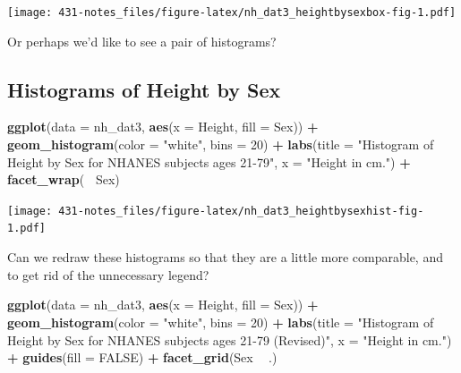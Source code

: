 \documentclass[
]{book}
\newenvironment{Shaded}{\begin{snugshade}}{\end{snugshade}}
\newcommand{\DataTypeTok}[1]{\textcolor[rgb]{0.13,0.29,0.53}{#1}}
\newcommand{\DecValTok}[1]{\textcolor[rgb]{0.00,0.00,0.81}{#1}}
\newcommand{\KeywordTok}[1]{\textcolor[rgb]{0.13,0.29,0.53}{\textbf{#1}}}
\newcommand{\NormalTok}[1]{#1}
\newcommand{\OperatorTok}[1]{\textcolor[rgb]{0.81,0.36,0.00}{\textbf{#1}}}
\newcommand{\OtherTok}[1]{\textcolor[rgb]{0.56,0.35,0.01}{#1}}
\newcommand{\StringTok}[1]{\textcolor[rgb]{0.31,0.60,0.02}{#1}}
\begin{document}
\texttt{[image: 431-notes\_files/figure-latex/nh\_dat3\_heightbysexbox-fig-1.pdf]}

Or perhaps we'd like to see a pair of histograms?

\hypertarget{histograms-of-height-by-sex}{%
\subsection{Histograms of Height by Sex}\label{histograms-of-height-by-sex}}

\begin{Shaded}
\begin{Highlighting}[]
\KeywordTok{ggplot}\NormalTok{(}\DataTypeTok{data =}\NormalTok{ nh_dat3, }\KeywordTok{aes}\NormalTok{(}\DataTypeTok{x =}\NormalTok{ Height, }\DataTypeTok{fill =}\NormalTok{ Sex)) }\OperatorTok{+}\StringTok{ }
\StringTok{    }\KeywordTok{geom_histogram}\NormalTok{(}\DataTypeTok{color =} \StringTok{"white"}\NormalTok{, }\DataTypeTok{bins =} \DecValTok{20}\NormalTok{) }\OperatorTok{+}\StringTok{ }
\StringTok{    }\KeywordTok{labs}\NormalTok{(}\DataTypeTok{title =} \StringTok{"Histogram of Height by Sex for NHANES subjects ages 21-79"}\NormalTok{,}
         \DataTypeTok{x =} \StringTok{"Height in cm."}\NormalTok{) }\OperatorTok{+}\StringTok{ }
\StringTok{    }\KeywordTok{facet_wrap}\NormalTok{(}\OperatorTok{~}\StringTok{ }\NormalTok{Sex)}
\end{Highlighting}
\end{Shaded}

\texttt{[image: 431-notes\_files/figure-latex/nh\_dat3\_heightbysexhist-fig-1.pdf]}

Can we redraw these histograms so that they are a little more comparable, and to get rid of the unnecessary legend?

\begin{Shaded}
\begin{Highlighting}[]
\KeywordTok{ggplot}\NormalTok{(}\DataTypeTok{data =}\NormalTok{ nh_dat3, }\KeywordTok{aes}\NormalTok{(}\DataTypeTok{x =}\NormalTok{ Height, }\DataTypeTok{fill =}\NormalTok{ Sex)) }\OperatorTok{+}\StringTok{ }
\StringTok{    }\KeywordTok{geom_histogram}\NormalTok{(}\DataTypeTok{color =} \StringTok{"white"}\NormalTok{, }\DataTypeTok{bins =} \DecValTok{20}\NormalTok{) }\OperatorTok{+}\StringTok{ }
\StringTok{    }\KeywordTok{labs}\NormalTok{(}\DataTypeTok{title =} \StringTok{"Histogram of Height by Sex for NHANES subjects ages 21-79 (Revised)"}\NormalTok{,}
         \DataTypeTok{x =} \StringTok{"Height in cm."}\NormalTok{) }\OperatorTok{+}\StringTok{ }
\StringTok{    }\KeywordTok{guides}\NormalTok{(}\DataTypeTok{fill =} \OtherTok{FALSE}\NormalTok{) }\OperatorTok{+}
\StringTok{    }\KeywordTok{facet_grid}\NormalTok{(Sex }\OperatorTok{~}\StringTok{ }\NormalTok{.)}
\end{Highlighting}
\end{Shaded}
\end{document}

